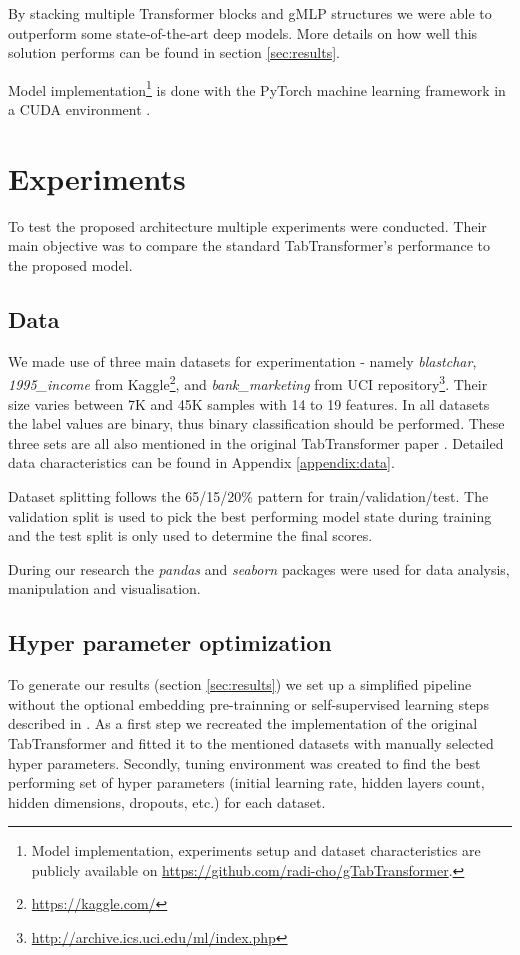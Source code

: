 \documentclass{article}
\newcommand{\projectSource}{\url{https://github.com/radi-cho/gTabTransformer}}
\begin{document}
By stacking multiple Transformer blocks and gMLP structures we were able to outperform some state-of-the-art deep models. More details on how well this solution performs can be found in section \ref{sec:results}.

Model implementation\footnote{Model implementation, experiments setup and dataset characteristics are publicly available on \projectSource.} is done with the PyTorch \cite{NEURIPS2019_9015} machine learning framework in a CUDA environment \cite{cuda}.

\section{Experiments}

To test the proposed architecture multiple experiments were conducted. Their main objective was to compare the standard TabTransformer's performance to the proposed model.

\subsection{Data}

We made use of three main datasets for experimentation - namely \textit{blastchar}, \textit{1995\_income} from Kaggle\footnote{\url{https://kaggle.com/}}, and \textit{bank\_marketing} from UCI repository\footnote{\url{http://archive.ics.uci.edu/ml/index.php}}. Their size varies between 7K and 45K samples with 14 to 19 features. In all datasets the label values are binary, thus binary classification should be performed. These three sets are all also mentioned in the original TabTransformer paper \cite{Huang2020TabTransformerTD}. Detailed data characteristics can be found in Appendix \ref{appendix:data}.

Dataset splitting follows the 65/15/20\% pattern for train/validation/test. The validation split is used to pick the best performing model state during training and the test split is only used to determine the final scores.

During our research the \textit{pandas} \cite{mckinney-proc-scipy-2010} and \textit{seaborn} \cite{Waskom2021} packages were used for data analysis, manipulation and visualisation.

\subsection{Hyper parameter optimization}

To generate our results (section \ref{sec:results}) we set up a simplified pipeline without the optional embedding pre-trainning or self-supervised learning steps described in \cite{Huang2020TabTransformerTD}. As a first step we recreated the implementation of the original TabTransformer and fitted it to the mentioned datasets with manually selected hyper parameters. Secondly, tuning environment was created to find the best performing set of hyper parameters (initial learning rate, hidden layers count, hidden dimensions, dropouts, etc.) for each dataset.
\end{document}
